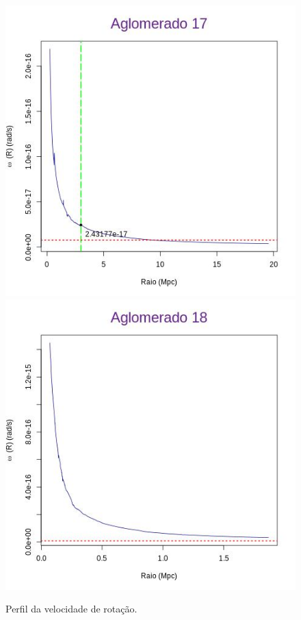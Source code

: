 \begin{anexosenv}
\begin{figure}[H]
\begin{center}
\includegraphics[scale=.3]{04-figuras/selec20/perfil17}
\includegraphics[scale=.3]{04-figuras/selec20/perfil18}
\caption{Perfil da velocidade de rotação.}
\label{fig6}%
\end{center}
\end{figure}


\end{anexosenv}
